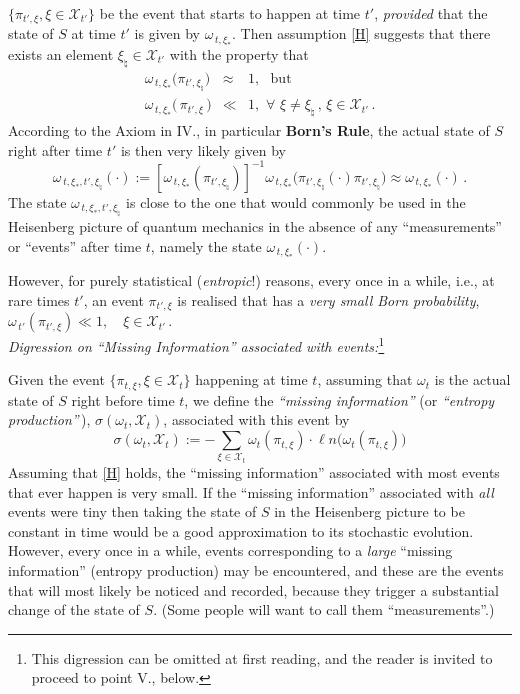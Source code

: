 \documentclass[12pt]{article}
\begin{document}
\mbox{$\lbrace \pi_{t', \xi}, \xi \in \mathcal{X}_{t'} \rbrace$} be the event that starts to happen at time $t'$, \textit{provided} that the state of $S$ at time $t'$ is given by $\omega_{\,t, \xi_{*}}$. Then assumption \eqref{H} suggests that there exists an element 
$\xi_{\natural}\in \mathcal{X}_{t'}$ with the property that 
\begin{eqnarray} \label{Continuity}
\omega_{\,t, \xi_{*}}\big(\pi_{t', \xi_{\natural}}\big) &\approx & 1, \,\,\text{ but }\nonumber \\
\omega_{\,t, \xi_{*}}\big(\,\pi_{t', \xi}\,\big) &\ll& 1, \,\,\forall\,\, \xi \not= \xi_{\natural}\,,\,\xi \in \mathcal{X}_{t'}\,.
\end{eqnarray}
According to the Axiom in IV., in particular {\bf{Born's Rule}}, the actual state of $S$ right after time $t'$ is then very likely given by 
$$\omega_{\,t, \xi_{*}, t',\xi_{\natural}}(\cdot) := [\omega_{\,t, \xi_{*}}(\pi_{t', \xi_{\natural}})]^{-1}\omega_{\,t, \xi_{*}}\big(\pi_{t', \xi_{\natural}} (\cdot) \pi_{t', \xi_{\natural}}\big) \approx \omega_{\,t, \xi_{*}}(\cdot)\,.$$
The state $\omega_{\,t, \xi_{*}, t',\xi_{\natural}}$ is close to the one that would commonly be used in the Heisenberg picture of quantum mechanics in the absence of any ``measurements'' or ``events'' after time $t$, namely the state 
$\omega_{\,t, \xi_{*}}(\cdot)$.

However, for purely statistical (\textit{entropic}!) reasons, every once in a while, i.e., at rare times $t'$, an event $\pi_{t',\xi}$ is realised that has a \textit{very small Born probability}, $\omega_{\,t'}(\pi_{t',\xi}) \ll 1,    \quad \xi \in \mathcal{X}_{t'}\,.$\\

\textit{Digression on ``Missing Information'' associated with events:}\footnote{This digression can be omitted at first reading, and the reader is invited to proceed to point V., below.}

Given the event $\lbrace \pi_{t,\xi}, \xi \in \mathcal{X}_{t} \rbrace$ happening at time $t$, assuming that $\omega_{t}$ is the actual state of $S$ right before time $t$, we define the \textit{``missing information''} (or \textit{``entropy production''}\,), $\sigma(\omega_{t}, \mathcal{X}_{t})$, associated with this event by
\begin{equation}\label{entropy}
\sigma(\omega_{t}, \mathcal{X}_{t}):= - \sum_{\xi \in \mathcal{X}_{t}} \omega_{t}(\pi_{t,\xi})\cdot \ell n\big( \omega_{t}(\pi_{t,\xi})\big)
\end{equation}
Assuming that \eqref{H} holds, the ``missing information'' associated with most events that ever happen is very small. If the ``missing information'' associated with \textit{all} events were tiny then taking the state of $S$ in the Heisenberg picture to be constant in time would be a good approximation to its stochastic evolution. However, every once in a while, events corresponding to a \textit{large} ``missing information'' (entropy production) may be encountered, and these are the events that will most likely be noticed and recorded, because they trigger a substantial change of the state of $S$. (Some people will want to call them ``measurements''.)
\end{document}
